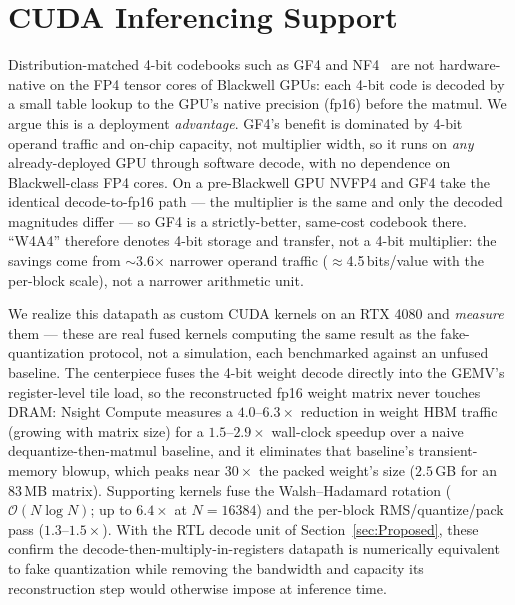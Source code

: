 \section{CUDA Inferencing Support}\label{sec:sw-support}

Distribution-matched 4-bit codebooks such as GF4 and NF4~\cite{dettmers2023qlora}
are not hardware-native on the FP4 tensor cores of Blackwell GPUs: each 4-bit code
is decoded by a small table lookup to the GPU's native precision (fp16) before the
matmul. We argue this is a deployment \emph{advantage}. GF4's benefit is dominated
by 4-bit operand traffic and on-chip capacity, not multiplier width, so it runs on
\emph{any} already-deployed GPU through software decode, with no dependence on
Blackwell-class FP4 cores. On a pre-Blackwell GPU NVFP4 and GF4 take the identical
decode-to-fp16 path --- the multiplier is the same and only the decoded magnitudes
differ --- so GF4 is a strictly-better, same-cost codebook there. ``W4A4''
therefore denotes 4-bit storage and transfer, not a 4-bit multiplier: the savings
come from $\sim$3.6$\times$ narrower operand traffic ($\approx$4.5\,bits/value with
the per-block scale), not a narrower arithmetic unit.

We realize this datapath as custom CUDA kernels on an RTX 4080 and \emph{measure}
them --- these are real fused kernels computing the same result as the
fake-quantization protocol, not a simulation, each benchmarked against an unfused
baseline. The centerpiece fuses the 4-bit weight decode directly into the GEMV's
register-level tile load, so the reconstructed fp16 weight matrix never touches
DRAM: Nsight Compute measures a $4.0$--$6.3\times$ reduction in weight HBM traffic
(growing with matrix size) for a $1.5$--$2.9\times$ wall-clock speedup over a naive
dequantize-then-matmul baseline, and it eliminates that baseline's transient-memory
blowup, which peaks near $30\times$ the packed weight's size ($2.5$\,GB for an
$83$\,MB matrix). Supporting kernels fuse the Walsh--Hadamard rotation
($\mathcal{O}(N\log N)$; up to $6.4\times$ at $N{=}16384$) and the per-block
RMS/quantize/pack pass ($1.3$--$1.5\times$). With the RTL decode unit of
Section~\ref{sec:Proposed}, these confirm the decode-then-multiply-in-registers
datapath is numerically equivalent to fake quantization while removing the
bandwidth and capacity its reconstruction step would otherwise impose at inference
time.

